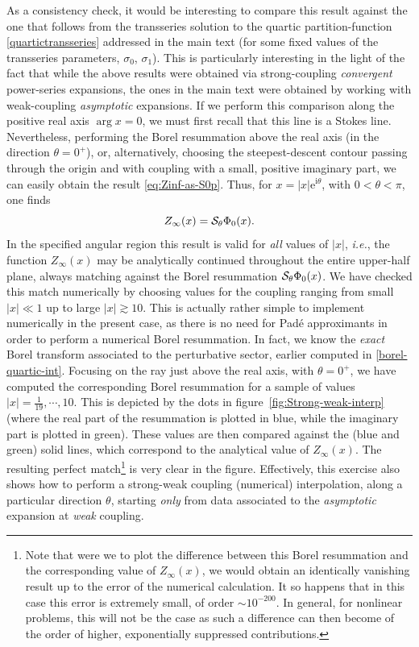 \documentclass[11pt,a4paper]{article}
\newcommand{\CS}{{\cal S}}
\newcommand{\rme}{{\mathrm{e}}}
\newcommand{\rmi}{{\mathrm{i}}}
\begin{document}
As a consistency check, it would be interesting to compare this result against the one that follows from the transseries solution to the quartic partition-function \eqref{quartictransseries} addressed in the main text (for some fixed values of the transseries parameters, $\sigma_{0}$, $\sigma_{1}$). This is particularly interesting in the light of the fact that while the above results were obtained via strong-coupling \textit{convergent} power-series expansions, the ones in the main text were obtained by working with weak-coupling \textit{asymptotic} expansions. If we perform this comparison along the positive real axis $\arg x=0$, we must first recall that this line is a Stokes line. Nevertheless, performing the Borel resummation above the real axis (in the direction $\theta=0^{+}$), or, alternatively, choosing the steepest-descent contour passing through the origin and with coupling with a small, positive imaginary part, we can easily obtain the result \eqref{eq:Zinf-as-S0p}. Thus, for $x = \left|x\right| \rme^{\rmi\theta}$, with $0<\theta<\pi$, one finds
%
\noindent
\begin{equation}
Z_{\infty} (x) = \CS_\theta \Phi_0 (x).
\end{equation}
%
\noindent
In the specified angular region this result is valid for \textit{all} values of $\left|x\right|$, \textit{i.e.}, the function $Z_{\infty} (x)$ may be analytically continued throughout the entire upper-half plane, always matching against the Borel resummation $\CS_\theta \Phi_0 (x)$. We have checked this match numerically by choosing values for the coupling ranging from small $\left|x\right|\ll1$ up to large $\left|x\right|\apprge10$. This is actually rather simple to implement numerically in the present case, as there is no need for Pad\'e approximants in order to perform a numerical Borel resummation. In fact, we know the \textit{exact} Borel transform associated to the perturbative sector, earlier computed in \eqref{borel-quartic-int}. Focusing on the ray just above the real axis, with $\theta=0^+$, we have computed the corresponding Borel resummation for a sample of values $\left|x\right| = \frac{1}{19}, \cdots, 10$. This is depicted by the dots in figure~\ref{fig:Strong-weak-interp} (where the real part of the resummation is plotted in blue, while the imaginary part is plotted in green). These values are then compared against the (blue and green) solid lines, which correspond to the analytical value of $Z_{\infty} (x)$. The resulting perfect match\footnote{Note that were we to plot the difference between this Borel resummation and the corresponding value of $Z_{\infty} (x)$, we would obtain an identically vanishing result up to the error of the numerical calculation. It so happens that in this case this error is extremely small, of order $\sim 10^{-200}$. In general, for nonlinear problems, this will not be the case as such a difference can then become of the order of higher, exponentially suppressed contributions.} is very clear in the figure. Effectively, this exercise also shows how to perform a strong-weak coupling (numerical) interpolation, along a particular direction $\theta$, starting \textit{only} from data associated to the \textit{asymptotic} expansion at \textit{weak} coupling. 
\end{document}
